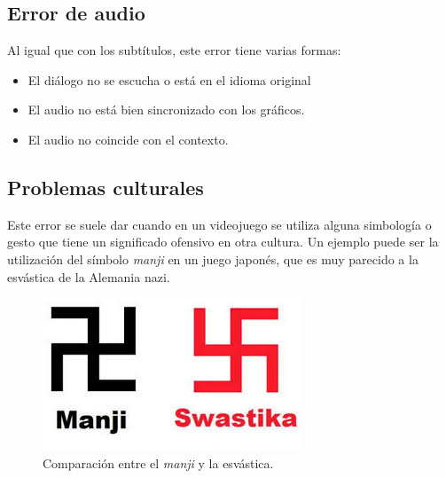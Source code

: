 \subsection{Error de audio}\label{ErrorAudio}
Al igual que con los subtítulos, este error tiene varias formas:
\begin{itemize}
	\item El diálogo no se escucha o está en el idioma original
	\item El audio no está bien sincronizado con los gráficos.
	\item El audio no coincide con el contexto.
\end{itemize}

\subsection{Problemas culturales}\label{ErrorCultura}
Este error se suele dar cuando en un videojuego se utiliza alguna simbología o gesto que tiene un significado ofensivo en otra cultura. Un ejemplo puede ser la utilización del símbolo \textit{manji} en un juego japonés, que es muy parecido a la esvástica de la Alemania nazi.
\begin{figure}[h]
	
	\centering
	\includegraphics{Imagenes/BugsLQA/Manji.jpg}
	\caption{Comparación entre el \textit{manji} y la esvástica.}
	\label{Manji}
\end{figure}

